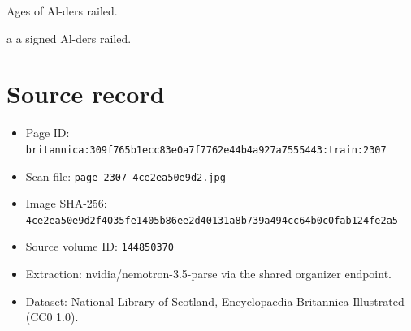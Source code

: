 \documentclass{article}
\begin{document}
Ages of Al-ders railed.

a a signed Al-ders railed.

\section*{Source record}
\begin{itemize}
\item Page ID: \texttt{britannica:309f765b1ecc83e0a7f7762e44b4a927a7555443:train:2307}
\item Scan file: \texttt{page-2307-4ce2ea50e9d2.jpg}
\item Image SHA-256: \texttt{4ce2ea50e9d2f4035fe1405b86ee2d40131a8b739a494cc64b0c0fab124fe2a5}
\item Source volume ID: \texttt{144850370}
\item Extraction: nvidia/nemotron-3.5-parse via the shared organizer endpoint.
\item Dataset: National Library of Scotland, Encyclopaedia Britannica Illustrated (CC0 1.0).
\end{itemize}
\end{document}
